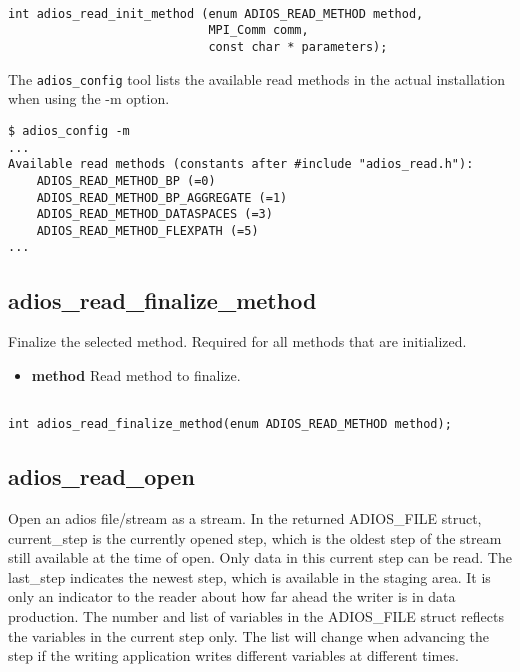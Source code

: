 \begin{lstlisting}[alsolanguage=C]

int adios_read_init_method (enum ADIOS_READ_METHOD method, 
                            MPI_Comm comm, 
                            const char * parameters);

\end{lstlisting}

The \verb+adios_config+ tool lists the available read methods in the actual installation when using the -m option.

\begin{lstlisting}
$ adios_config -m
...
Available read methods (constants after #include "adios_read.h"):
    ADIOS_READ_METHOD_BP (=0)
    ADIOS_READ_METHOD_BP_AGGREGATE (=1)
    ADIOS_READ_METHOD_DATASPACES (=3)
    ADIOS_READ_METHOD_FLEXPATH (=5)
...
\end{lstlisting}


\subsection{adios\_read\_finalize\_method}

Finalize the selected method. Required for all methods that are initialized. 
\begin{itemize}
\item{\bf method} Read method to finalize. 
\end{itemize}

\begin{lstlisting}[alsolanguage=C]

int adios_read_finalize_method(enum ADIOS_READ_METHOD method);
\end{lstlisting}


\subsection{adios\_read\_open}
Open an adios file/stream as a stream. In the returned ADIOS\_FILE struct, current\_step is the 
currently opened step, which is the oldest step of the stream still available at the time of open.
Only data in this current step can be read.
The last\_step indicates the newest step, which is available in the staging area. It is only an indicator
to the reader about how far ahead the writer is in data production.  
The number and list of variables in the ADIOS\_FILE struct reflects the variables in the current step only.
The list will change when advancing the step if the writing 
application writes different variables at different times. 

